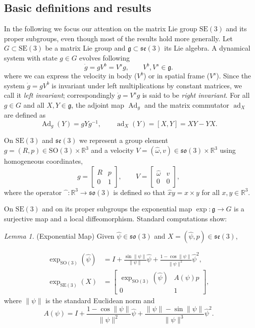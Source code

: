 \documentclass[10pt,twocolumn]{article}
\newcommand{\SO}{\mathrm{SO}}
\newcommand{\SE}{\mathrm{SE}}
\newcommand{\so}{\mathfrak{so}}
\newcommand{\se}{\mathfrak{se}}
\newcommand{\gfrak}{\mathfrak g}
\newcommand{\Ad}{\operatorname{Ad}}
\newcommand{\ad}{\operatorname{ad}}
\newcommand{\R}{\mathbb R}
\newcommand{\paperhead}[2]{\par\medskip\noindent\textit{#1} #2\par}
\begin{document}
\subsection{Basic definitions and results}
In the following we focus our attention on the matrix Lie group $\SE(3)$ and its proper subgroups, even though most of the results hold more generally. Let $G\subset\SE(3)$ be a matrix Lie group and $\gfrak\subset\se(3)$ its Lie algebra. A dynamical system with state $g\in G$ evolves following
\begin{equation*}
\dot g=gV^b=V^s g,\qquad V^b,V^s\in\gfrak.\tag{1}
\end{equation*}
where we can express the velocity in body ($V^b$) or in spatial frame ($V^s$). Since the system $\dot g=gV^b$ is invariant under left multiplications by constant matrices, we call it \emph{left invariant}; correspondingly $\dot g=V^s g$ is said to be \emph{right invariant}. For all $g\in G$ and all $X,Y\in\gfrak$, the adjoint map $\Ad_g$ and the matrix commutator $\ad_X$ are defined as
\begin{equation*}
\Ad_g(Y)=gYg^{-1},
\qquad
\ad_X(Y)=[X,Y]=XY-YX.
\end{equation*}

On $\SE(3)$ and $\se(3)$ we represent a group element $g=(R,p)\in\SO(3)\times\R^3$ and a velocity $V=(\widehat\omega,v)\in\so(3)\times\R^3$ using homogeneous coordinates,
\begin{equation*}
g=\begin{bmatrix}R&p\\0&1\end{bmatrix},
\qquad
V=\begin{bmatrix}\widehat\omega&v\\0&0\end{bmatrix},
\end{equation*}
where the operator $\widehat{\phantom{x}}:\R^3\to\so(3)$ is defined so that $\widehat{x}y=x\times y$ for all $x,y\in\R^3$.

On $\SE(3)$ and on its proper subgroups the exponential map $\exp:\gfrak\to G$ is a surjective map and a local diffeomorphism. Standard computations show:

\paperhead{Lemma 1.}{(Exponential Map) Given $\widehat\psi\in\so(3)$ and $X=(\widehat\psi,p)\in\se(3)$,}
\begin{align*}
\exp_{\SO(3)}(\widehat\psi)
&=I+\frac{\sin\|\psi\|}{\|\psi\|}\widehat\psi
+\frac{1-\cos\|\psi\|}{\|\psi\|^2}\widehat\psi^2,\\[0.4em]
\exp_{\SE(3)}(X)
&=\begin{bmatrix}
\exp_{\SO(3)}(\widehat\psi)&A(\psi)p\\
0&1
\end{bmatrix},
\end{align*}
where $\|\psi\|$ is the standard Euclidean norm and
\begin{equation*}
A(\psi)=I+\frac{1-\cos\|\psi\|}{\|\psi\|^2}\widehat\psi
+\frac{\|\psi\|-\sin\|\psi\|}{\|\psi\|^3}\widehat\psi^2.
\end{equation*}
\end{document}
